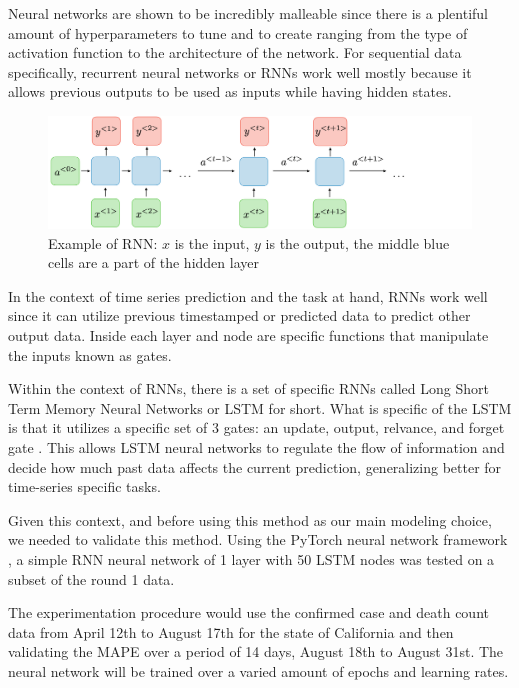 \documentclass[sigconf,nonacm]{acmart}
\begin{document}
Neural networks are shown to be incredibly malleable since there is a plentiful
amount of hyperparameters to tune and to create ranging from the type of
activation function to the architecture of the network. For sequential data
specifically, recurrent neural networks or RNNs work well mostly because it
allows previous outputs to be used as inputs while having hidden states. 

\begin{figure}
  \centering
  \includegraphics[width=\linewidth]{figures/architecture-rnn-ltr.png}
  \caption{Example of RNN: $x$ is the input, $y$ is the output, the middle blue
  cells are a part of the hidden layer}
  \label{fig:rnn}
\end{figure}

In the context of time series prediction and the task at hand, RNNs work well
since it can utilize previous timestamped or predicted data to predict other
output data. Inside each layer and node are specific functions that manipulate
the inputs known as gates.

Within the context of RNNs, there is a set of specific RNNs called Long Short
Term Memory Neural Networks or LSTM for short. What is specific of the LSTM is
that it utilizes a specific set of 3 gates: an update, output, relvance, and
forget gate \cite{LSTMlecture}. This allows LSTM neural networks to regulate
the flow of information and decide how much past data affects the current
prediction, generalizing better for time-series specific tasks.

Given this context, and before using this method as our main modeling choice,
we needed to validate this method. Using the PyTorch neural network framework
\cite{Pytorch}, a simple RNN neural network of 1 layer with 50 LSTM nodes was
tested on a subset of the round 1 data. 

The experimentation procedure would use the confirmed case and death count data
from April 12th to August 17th for the state of California and then validating
the MAPE over a period of 14 days, August 18th to August 31st. The neural
network will be trained over a varied amount of epochs and learning rates. 
\end{document}
